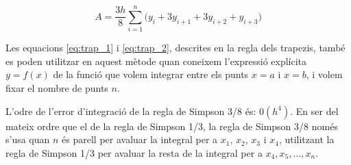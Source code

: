  \begin{equation}\label{eq:simp_3_8}
   A =  \frac{3h}{8} \sum_{i=1}^{n} \big( y_i + 3 y_{i+1} + 3 y_{i+2} + y_{i+3}\big)
 \end{equation}

 Les equacions \eqref{eq:trap_1} i \eqref{eq:trap_2}, descrites en la regla dels trapezis, també es poden utilitzar en aquest mètode quan  coneixem l'expressió explícita $y=f(x)$ de la funció que volem integrar entre els punts $x=a$ i $x=b$, i volem fixar el nombre de punts $n$.

 L'odre de l'error d'integració de la regla de Simpson 3/8 és: $0(h^4)$. En ser del mateix ordre que el de la regla de Simpson 1/3, la regla de Simpson 3/8 només s'usa quan $n$ és parell per avaluar la integral per a $x_1$, $x_2$, $x_3$ i $x_4$, utilitzant la regla de Simpson 1/3 per avaluar la resta de la integral per a  $x_4, x_5, \dotsc , x_n$.

